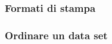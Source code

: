 \documentclass[12pt]{beamer}
\begin{document}
\begin{frame}[containsverbatim]\frametitle{Formati di stampa}
\end{frame}



\begin{frame}[containsverbatim]\frametitle{Ordinare un data set}
\end{frame}








\end{document}

